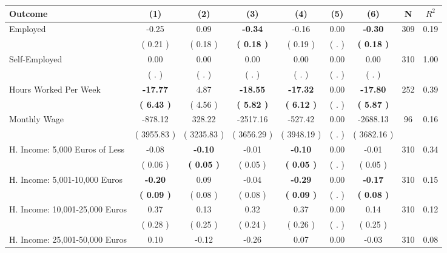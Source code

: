 \begin{tabular}{lcccccccc}
\toprule
 \textbf{Outcome} & \textbf{(1)} & \textbf{(2)} & \textbf{(3)} & \textbf{(4)} & \textbf{(5)} & \textbf{(6)} & \textbf{N} & \textbf{$ R^2$} \\
\midrule
Employed &     -0.25 &      0.09 & \textbf{    -0.34} &     -0.16 &      0.00 & \textbf{    -0.30} & 309 &       0.19 \\ 
 & (     0.21 ) & (     0.18 ) & \textbf{(     0.18 )} & (     0.19 ) & (        . ) & \textbf{(     0.18 )} & \\
Self-Employed &      0.00 &      0.00 &      0.00 &      0.00 &      0.00 &      0.00 & 310 &       1.00 \\ 
 & (        . ) & (        . ) & (        . ) & (        . ) & (        . ) & (        . ) & \\
Hours Worked Per Week & \textbf{   -17.77} &      4.87 & \textbf{   -18.55} & \textbf{   -17.32} &      0.00 & \textbf{   -17.80} & 252 &       0.39 \\ 
 & \textbf{(     6.43 )} & (     4.56 ) & \textbf{(     5.82 )} & \textbf{(     6.12 )} & (        . ) & \textbf{(     5.87 )} & \\
Monthly Wage &   -878.12 &    328.22 &  -2517.16 &   -527.42 &      0.00 &  -2688.13 & 96 &       0.16 \\ 
 & (  3955.83 ) & (  3235.83 ) & (  3656.29 ) & (  3948.19 ) & (        . ) & (  3682.16 ) & \\
H. Income: 5,000 Euros of Less &     -0.08 & \textbf{    -0.10} &     -0.01 & \textbf{    -0.10} &      0.00 &     -0.01 & 310 &       0.34 \\ 
 & (     0.06 ) & \textbf{(     0.05 )} & (     0.05 ) & \textbf{(     0.05 )} & (        . ) & (     0.05 ) & \\
H. Income: 5,001-10,000 Euros & \textbf{    -0.20} &      0.09 &     -0.04 & \textbf{    -0.29} &      0.00 & \textbf{    -0.17} & 310 &       0.15 \\ 
 & \textbf{(     0.09 )} & (     0.08 ) & (     0.08 ) & \textbf{(     0.09 )} & (        . ) & \textbf{(     0.08 )} & \\
H. Income: 10,001-25,000 Euros &      0.37 &      0.13 &      0.32 &      0.37 &      0.00 &      0.14 & 310 &       0.12 \\ 
 & (     0.28 ) & (     0.25 ) & (     0.24 ) & (     0.26 ) & (        . ) & (     0.25 ) & \\
H. Income: 25,001-50,000 Euros &      0.10 &     -0.12 &     -0.26 &      0.07 &      0.00 &     -0.03 & 310 &       0.08 \\ 

\end{tabular}
